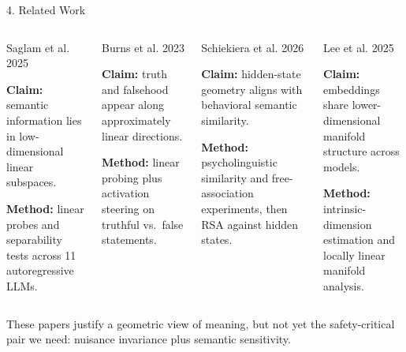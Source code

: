 \documentclass[aspectratio=169,11pt]{beamer}
\begin{document}
\begin{frame}{4. Related Work}
  \begin{columns}[T,totalwidth=\textwidth]
      \begin{block}{Saglam et al. 2025}
      {\scriptsize
      \textbf{Claim:} semantic information lies in low-dimensional linear subspaces.

      \textbf{Method:} linear probes and separability tests across 11 autoregressive LLMs.
      }
      \end{block}

      \begin{block}{Burns et al. 2023}
      {\scriptsize
      \textbf{Claim:} truth and falsehood appear along approximately linear directions.

      \textbf{Method:} linear probing plus activation steering on truthful vs.\ false statements.
      }
      \end{block}
      \begin{block}{Schiekiera et al. 2026}
      {\scriptsize
      \textbf{Claim:} hidden-state geometry aligns with behavioral semantic similarity.

      \textbf{Method:} psycholinguistic similarity and free-association experiments, then RSA against hidden states.
      }
      \end{block}

      \begin{block}{Lee et al. 2025}
      {\scriptsize
      \textbf{Claim:} embeddings share lower-dimensional manifold structure across models.

      \textbf{Method:} intrinsic-dimension estimation and locally linear manifold analysis.
      }
      \end{block}
  \end{columns}

  \vspace{0.15cm}
  {\scriptsize\color{SignalRust}These papers justify a geometric view of meaning, but not yet the safety-critical pair we need: nuisance invariance plus semantic sensitivity.}
\end{frame}
\end{document}
